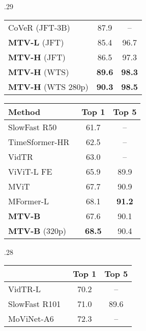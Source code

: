 \begin{table*}[t]
\begin{subtable}[t]{.29\linewidth}
{\begin{tabular}{lcc}
	  			CoVeR (JFT-3B)~\cite{zhang2021co} & 87.9 & -- \\
	  			\textbf{MTV-L} (JFT) &  85.4 &  96.7 \\ \textbf{MTV-H} (JFT) &  86.5 &  97.3 \\ \textbf{MTV-H} (WTS) &  \textbf{89.6} &  \textbf{98.3} \\ \textbf{MTV-H} (WTS 280p) &  \textbf{90.3} &  \textbf{98.5} \\ \bottomrule
	  		\end{tabular}
	  		\label{tab:sota_kinetics600}
  		}
  		\vspace{0.6\baselineskip} \centering
		\caption{Something-Something v2}
		\vspace{-0.1\baselineskip}
		\setlength{\tabcolsep}{6pt} \scriptsize{
			\begin{tabular}{lcc}
				\toprule
				Method 												  & Top 1                & Top 5   \\
				\midrule
				SlowFast R50~\cite{feichtenhofer_iccv_2019,wu_multigrid_cvpr_2020}		& 61.7 & --    \\
				TimeSformer-HR~\cite{bertasius_arxiv_2021}					& 62.5 & -- \\
				VidTR~\cite{zhang2021vidtr} & 63.0 & -- \\
				ViViT-L FE~\cite{arnab2021vivit}		& 65.9  & 89.9 \\ MViT~\cite{fan2021multiscale} & 67.7 & 90.9 \\
				MFormer-L~\cite{patrick2021keeping} & 68.1 & \textbf{91.2}  \\
				\textbf{MTV-B} & 67.6 & 90.1 \\ \textbf{MTV-B} (320p) & \textbf{68.5} & 90.4 \\ \bottomrule
			\end{tabular}
			\label{tab:sota_ssv2}
		}
  	\end{subtable}
  	\hfill
  	\begin{subtable}[t]{.28\linewidth}
  		\setlength{\tabcolsep}{4pt} \centering
  		\caption{Kinetics 700}
  		\vspace{-0.3\baselineskip}
  		\setlength{\tabcolsep}{6pt} \scriptsize{
  			\begin{tabular}{lcc}
  				\toprule
  				& Top 1 & Top 5 \\ 
  				\midrule
  				VidTR-L~\cite{zhang2021vidtr} & 70.2 & -- \\
  				SlowFast R101~\cite{feichtenhofer_iccv_2019} 	&  71.0 & 89.6       \\
  				MoViNet-A6~\cite{kondratyuk2021movinets} 	&  72.3     &  --     \\

\end{tabular}}
\end{subtable}
\end{table*}
